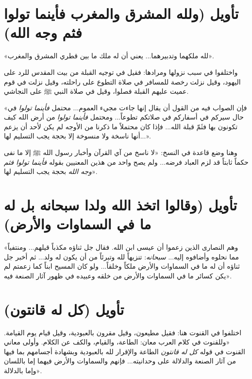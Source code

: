 \separator

\section{تأويل (ولله المشرق والمغرب فأينما تولوا فثم وجه الله)}
 «لله ملكهما وتدبيرهما... يعني أن له ملك ما بين قطري المشرق والمغرب».

واختلفوا في سبب نزولها ومرادها: فقيل في توجيه القبلة من بيت المقدس للرد على اليهود، وقيل نزلت رخصة للمسافر في صلاة التطوع على راحلته، وقيل نزلت في قوم عميت عليهم القبلة فصلوا، وقيل في صلاة النبي ﷺ على النجاشي.

 «فإن الصواب فيه من القول أن يقال إنها جاءت مجيء العموم... محتمل \textit{فأينما تولوا} في حال سيركم في أسفاركم في صلاتكم تطوعاً... ومحتمل \textit{فأينما تولوا} من أرض الله كيف تكونون بها فثَمّ قبلة الله... فإذا كان محتملاً ما ذكرنا من الأوجه لم يكن لأحد أن يزعم أنها ناسخة ولا منسوخة إلا بحجة يجب التسليم لها...».

وهنا وضع قاعدة في النسخ: «لا ناسخ من آي القرآن وأخبار رسول الله ﷺ إلا ما نفى حكماً ثابتاً قد لزم العباد فرضه... ولم يصح واحد من هذين المعنيين بقوله \textit{فأينما تولوا فثم وجه الله} بحجة يجب التسليم لها».

\separator

\section{تأويل (وقالوا اتخذ الله ولدا سبحانه بل له ما في السماوات والأرض)}
 «وهم النصارى الذين زعموا أن عيسى ابن الله. فقال جل ثناؤه مكذباً قيلهم... ومنتفياً مما نحلوه وأضافوه إليه... \textit{سبحانه}: تنزيهاً لله وتبرئاً من أن يكون له ولد... ثم أخبر جل ثناؤه أن له ما في السماوات والأرض ملكاً وخلقاً... ولو كان المسيح ابناً كما زعمتم لم يكن كسائر ما في السماوات والأرض من خلقه وعبيده في ظهور آثار الصنعة فيه».

\separator

\section{تأويل (كل له قانتون)}
اختلفوا في القنوت هنا: فقيل مطيعون، وقيل مقرون بالعبودية، وقيل قيام يوم القيامة.
 «وللقنوت في كلام العرب معان: الطاعة، والقيام، والكف عن الكلام. وأولى معاني القنوت في قوله \textit{كل له قانتون} الطاعة والإقرار لله بالعبودية وبشهادة أجسامهم بما فيها من آثار الصنعة والدلالة على وحدانيته... فإنهم والسماوات والأرض فيهما إما باللسان وإما بالدلالة».

